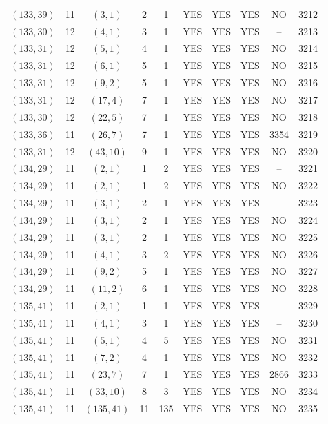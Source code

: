 \begin{longtable}{|c|c|c|c|c|c|c|c|c|c|}
$(133, 39)$ & 11 & $(3, 1)$ & 2 & 1 & YES & YES & YES & NO & 3212\\
$(133, 30)$ & 12 & $(4, 1)$ & 3 & 1 & YES & YES & YES & -- & 3213\\
$(133, 31)$ & 12 & $(5, 1)$ & 4 & 1 & YES & YES & YES & NO & 3214\\
$(133, 31)$ & 12 & $(6, 1)$ & 5 & 1 & YES & YES & YES & NO & 3215\\
$(133, 31)$ & 12 & $(9, 2)$ & 5 & 1 & YES & YES & YES & NO & 3216\\
$(133, 31)$ & 12 & $(17, 4)$ & 7 & 1 & YES & YES & YES & NO & 3217\\
$(133, 30)$ & 12 & $(22, 5)$ & 7 & 1 & YES & YES & YES & NO & 3218\\
$(133, 36)$ & 11 & $(26, 7)$ & 7 & 1 & YES & YES & YES & 3354 & 3219\\
$(133, 31)$ & 12 & $(43, 10)$ & 9 & 1 & YES & YES & YES & NO & 3220\\
$(134, 29)$ & 11 & $(2, 1)$ & 1 & 2 & YES & YES & YES & -- & 3221\\
$(134, 29)$ & 11 & $(2, 1)$ & 1 & 2 & YES & YES & YES & NO & 3222\\
$(134, 29)$ & 11 & $(3, 1)$ & 2 & 1 & YES & YES & YES & -- & 3223\\
$(134, 29)$ & 11 & $(3, 1)$ & 2 & 1 & YES & YES & YES & NO & 3224\\
$(134, 29)$ & 11 & $(3, 1)$ & 2 & 1 & YES & YES & YES & NO & 3225\\
$(134, 29)$ & 11 & $(4, 1)$ & 3 & 2 & YES & YES & YES & NO & 3226\\
$(134, 29)$ & 11 & $(9, 2)$ & 5 & 1 & YES & YES & YES & NO & 3227\\
$(134, 29)$ & 11 & $(11, 2)$ & 6 & 1 & YES & YES & YES & NO & 3228\\
$(135, 41)$ & 11 & $(2, 1)$ & 1 & 1 & YES & YES & YES & -- & 3229\\
$(135, 41)$ & 11 & $(4, 1)$ & 3 & 1 & YES & YES & YES & -- & 3230\\
$(135, 41)$ & 11 & $(5, 1)$ & 4 & 5 & YES & YES & YES & NO & 3231\\
$(135, 41)$ & 11 & $(7, 2)$ & 4 & 1 & YES & YES & YES & NO & 3232\\
$(135, 41)$ & 11 & $(23, 7)$ & 7 & 1 & YES & YES & YES & 2866 & 3233\\
$(135, 41)$ & 11 & $(33, 10)$ & 8 & 3 & YES & YES & YES & NO & 3234\\
$(135, 41)$ & 11 & $(135, 41)$ & 11 & 135 & YES & YES & YES & NO & 3235\\

\end{longtable}
